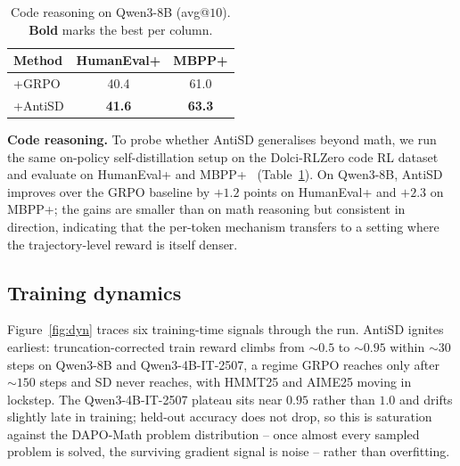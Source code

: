 \documentclass{llmxive}
\providecommand{\arraystretch}{0.95}
\begin{document}
\begin{table}[t]
\vspace{-1.5em}
  \centering
  \small
  \setlength{\tabcolsep}{6pt}
  \renewcommand{\arraystretch}{0.95}
  \begin{tabular}{l|cc}
    \toprule
    \textbf{Method}              & \textbf{HumanEval+} & \textbf{MBPP+} \\
    \midrule
    +GRPO                        & 40.4                & 61.0           \\
    \rowcolor{antisdrow} +AntiSD & \textbf{41.6}       & \textbf{63.3}  \\
    \bottomrule
  \end{tabular}
  \vspace{-1.0em}

\caption{{Code reasoning on Qwen3-8B} (avg@$10$). \textbf{Bold} marks the best per column.}
\label{tab:code}
\end{table}


\textbf{Code reasoning.} To probe whether AntiSD generalises beyond math, we run the same on-policy self-distillation setup on the Dolci-RLZero code RL dataset \citep{olmo2025olmo3} and evaluate on HumanEval+ and MBPP+~\citep{liu2023your} (Table~\ref{tab:code}). On Qwen3-8B, AntiSD improves over the GRPO baseline by $+1.2$ points on HumanEval+ and $+2.3$ on MBPP+; the gains are smaller than on math reasoning but consistent in direction, indicating that the per-token mechanism transfers to a setting where the trajectory-level reward is itself denser.


\subsection{Training dynamics}
\label{sec:exp:dyn}
\vspace{-0.5em}

Figure~\ref{fig:dyn} traces six training-time signals through the run. AntiSD ignites earliest: truncation-corrected train reward climbs from $\sim 0.5$ to $\sim 0.95$ within $\sim 30$ steps on Qwen3-8B and Qwen3-4B-IT-2507, a regime GRPO reaches only after $\sim 150$ steps and SD never reaches, with HMMT25 and AIME25 moving in lockstep. The Qwen3-4B-IT-2507 plateau sits near $0.95$ rather than $1.0$ and drifts slightly late in training; held-out accuracy does not drop, so this is saturation against the DAPO-Math problem distribution -- once almost every sampled problem is solved, the surviving gradient signal is noise -- rather than overfitting.
\end{document}

